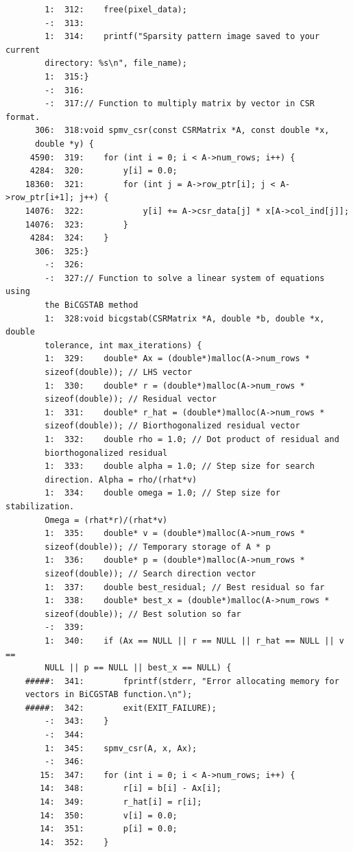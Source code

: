 \documentclass[12pt]{article}
\begin{document}
\begin{mdframed}[style=myboxstyleTerminal1]
\begin{verbatim}
        1:  312:    free(pixel_data);
        -:  313:
        1:  314:    printf("Sparsity pattern image saved to your current 
        directory: %s\n", file_name);
        1:  315:}
        -:  316:
        -:  317:// Function to multiply matrix by vector in CSR format.
      306:  318:void spmv_csr(const CSRMatrix *A, const double *x, 
      double *y) {
     4590:  319:    for (int i = 0; i < A->num_rows; i++) {
     4284:  320:        y[i] = 0.0;
    18360:  321:        for (int j = A->row_ptr[i]; j < A->row_ptr[i+1]; j++) {
    14076:  322:            y[i] += A->csr_data[j] * x[A->col_ind[j]];
    14076:  323:        }
     4284:  324:    }
      306:  325:}
        -:  326:
        -:  327:// Function to solve a linear system of equations using 
        the BiCGSTAB method
        1:  328:void bicgstab(CSRMatrix *A, double *b, double *x, double 
        tolerance, int max_iterations) {
        1:  329:    double* Ax = (double*)malloc(A->num_rows * 
        sizeof(double)); // LHS vector
        1:  330:    double* r = (double*)malloc(A->num_rows * 
        sizeof(double)); // Residual vector
        1:  331:    double* r_hat = (double*)malloc(A->num_rows * 
        sizeof(double)); // Biorthogonalized residual vector
        1:  332:    double rho = 1.0; // Dot product of residual and 
        biorthogonalized residual
        1:  333:    double alpha = 1.0; // Step size for search 
        direction. Alpha = rho/(rhat*v)
        1:  334:    double omega = 1.0; // Step size for stabilization. 
        Omega = (rhat*r)/(rhat*v)
        1:  335:    double* v = (double*)malloc(A->num_rows * 
        sizeof(double)); // Temporary storage of A * p
        1:  336:    double* p = (double*)malloc(A->num_rows * 
        sizeof(double)); // Search direction vector
        1:  337:    double best_residual; // Best residual so far
        1:  338:    double* best_x = (double*)malloc(A->num_rows * 
        sizeof(double)); // Best solution so far
        -:  339:
        1:  340:    if (Ax == NULL || r == NULL || r_hat == NULL || v == 
        NULL || p == NULL || best_x == NULL) {
    #####:  341:        fprintf(stderr, "Error allocating memory for 
    vectors in BiCGSTAB function.\n");
    #####:  342:        exit(EXIT_FAILURE);
        -:  343:    }
        -:  344:
        1:  345:    spmv_csr(A, x, Ax);
        -:  346:
       15:  347:    for (int i = 0; i < A->num_rows; i++) {
       14:  348:        r[i] = b[i] - Ax[i];
       14:  349:        r_hat[i] = r[i];
       14:  350:        v[i] = 0.0;
       14:  351:        p[i] = 0.0;
       14:  352:    }

\end{verbatim}
\end{mdframed}
\end{document}
